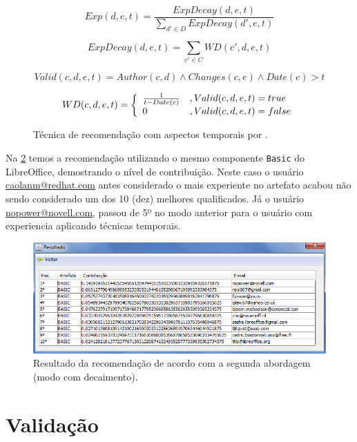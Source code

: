 \documentclass[oneside,brazil,a4paper]{normas-utf-tex}
\begin{document}
\begin{figure}[hbt]
$$
    Exp(d, e, t) = \frac{ExpDecay(d, e, t)}{\sum_{d' \in D} ExpDecay(d', e, t)}
$$

$$
    ExpDecay(d, e, t)  = \sum_{c' \in C} WD(c', d, e, t)
$$

$$
    Valid(c, d, e, t) = Author(c,d) \land Changes(c, e) \land Date(c) > t
$$

$$
    WD(c, d, e, t) = \left\{
        \begin{array}{l l}
            \frac{1}{t-Date(c)}  & , Valid(c, d, e, t) = true\\
            0  & , Valid(c, d, e, t) = false\\
        \end{array} \right.
$$
    \caption[Técnica de recomendação com aspectos temporais.]{Técnica de recomendação com aspectos temporais por .}
  
    \label{fig:exp2}
\end{figure}


Na \cref{fig:processExp}  temos a recomendação utilizando o mesmo componente \texttt{Basic} do LibreOffice, demostrando o nível de contribuição. Neste caso o usuário \url{caolanm@redhat.com} antes considerado o mais experiente no artefato acabou não sendo considerado um dos 10 (dez) melhores qualificados. Já o usuário \url{nopower@novell.com}, passou de 5º no modo anterior para o usuário com experiencia aplicando técnicas temporais.

\begin{figure}[!htb]
    \centering
    \includegraphics[width=\textwidth]{figuras/resultadoExp}
    \caption{Resultado da recomendação de acordo com a segunda abordagem (modo com decaimento).}
    \label{fig:processExp}
\end{figure}

\section{Validação}
\end{document}
